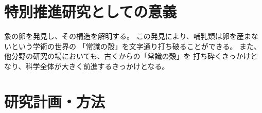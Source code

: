 \documentclass[11pt,a4j,dvipdfmx]{jarticle} 					%
\newcommand{\研究課題名}{象の卵}
\newcommand{\研究機関名}{逢坂大学}
\newcommand{\研究代表者氏名}{湯川秀樹}
\newcommand{\研究期間の最終元号年度}{8}  %
\begin{document}



\section{特別推進研究としての意義}

	象の卵を発見し、その構造を解明する。
	この発見により、哺乳類は卵を産まないという学術の世界の
	「常識の殻」を文字通り打ち破ることができる。
	また、他分野の研究の場においても、古くからの「常識の殻」を
	打ち砕くきっかけとなり、科学全体が大きく前進するきっかけとなる。




\section{研究計画・方法}

\end{document}
